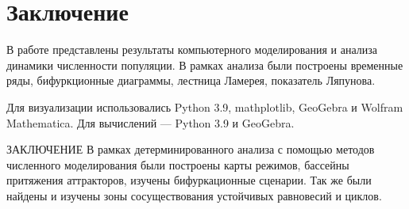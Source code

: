 \section{Заключение}



    В работе представлены результаты компьютерного моделирования и анализа динамики численности популяции. В рамках анализа были построены временные ряды, бифуркционные диаграммы, лестница Ламерея, показатель Ляпунова.

    Для визуализации использовались Python 3.9, mathplotlib, GeoGebra и Wolfram Mathematica. Для вычислений --- Python 3.9 и GeoGebra.

    ЗАКЛЮЧЕНИЕ 
В рамках детерминированного анализа с помощью методов численного моделирования были построены карты режимов, бассейны притяжения аттракторов, изучены бифуркационные сценарии. Так же были найдены и изучены зоны сосуществования устойчивых равновесий и циклов.

